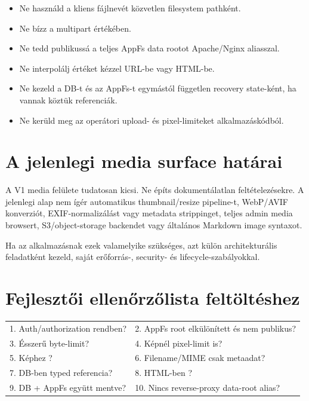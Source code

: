 \begin{itemize}
  \item Ne használd a kliens fájlnevét közvetlen filesystem pathként.
  \item Ne bízz a multipart  értékében.
  \item Ne tedd publikussá a teljes AppFs data rootot Apache/Nginx aliasszal.
  \item Ne interpolálj  értéket kézzel URL-be vagy HTML-be.
  \item Ne kezeld a DB-t és az AppFs-t egymástól független recovery state-ként, ha vannak köztük referenciák.
  \item Ne kerüld meg az operátori upload- és pixel-limiteket alkalmazáskódból.
\end{itemize}

\section{A jelenlegi media surface határai}

A V1 media felülete tudatosan kicsi. Ne építs dokumentálatlan feltételezésekre. A jelenlegi alap nem ígér automatikus thumbnail/resize pipeline-t, WebP/AVIF konverziót, EXIF-normalizálást vagy metadata strippinget, teljes admin media browsert, S3/object-storage backendet vagy általános Markdown image syntaxot.

Ha az alkalmazásnak ezek valamelyike szükséges, azt külön architekturális feladatként kezeld, saját erőforrás-, security- és lifecycle-szabályokkal.

\section{Fejlesztői ellenőrzőlista feltöltéshez}

{\small
\begin{tabularx}{\textwidth}{@{}Y Y@{}}
1. Auth/authorization rendben? & 2. AppFs root elkülönített és nem publikus? \\
3. Ésszerű byte-limit? & 4. Képnél pixel-limit is? \\
5. Képhez ? & 6. Filename/MIME csak metaadat? \\
7. DB-ben typed referencia? & 8. HTML-ben ? \\
9. DB + AppFs együtt mentve? & 10. Nincs reverse-proxy data-root alias? \\
\end{tabularx}
}
